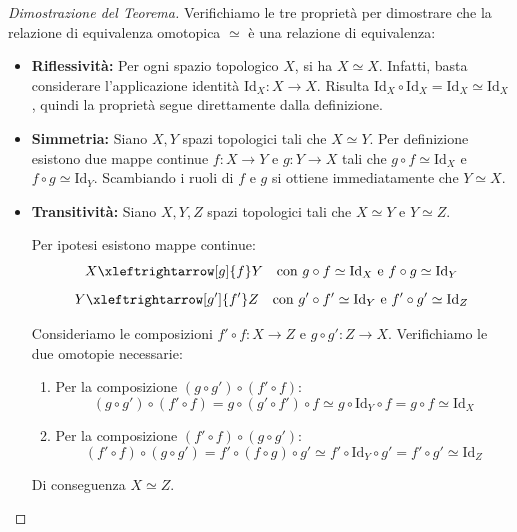 \begin{proof}[Dimostrazione del Teorema]
Verifichiamo le tre proprietà per dimostrare che la relazione di equivalenza omotopica $\simeq$ è una relazione di equivalenza:

\begin{itemize}
    \item \textbf{Riflessività:} Per ogni spazio topologico $X$, si ha $X \simeq X$.
    Infatti, basta considerare l'applicazione identità $\mathrm{Id}_X: X \to X$. Risulta $\mathrm{Id}_X \circ \mathrm{Id}_X = \mathrm{Id}_X \simeq \mathrm{Id}_X$, quindi la proprietà segue direttamente dalla definizione.

    \item \textbf{Simmetria:} Siano $X, Y$ spazi topologici tali che $X \simeq Y$.
    Per definizione esistono due mappe continue $f: X \to Y$ e $g: Y \to X$ tali che $g \circ f \simeq \mathrm{Id}_X$ e $f \circ g \simeq \mathrm{Id}_Y$. Scambiando i ruoli di $f$ e $g$ si ottiene immediatamente che $Y \simeq X$.

    \item \textbf{Transitività:} Siano $X, Y, Z$ spazi topologici tali che $X \simeq Y$ e $Y \simeq Z$.
    
    Per ipotesi esistono mappe continue:
    \[
    X \xleftrightarrow[g]{f} Y \quad \text{con } g \circ f \simeq \mathrm{Id}_X \text{ e } f \circ g \simeq \mathrm{Id}_Y
    \]
    \[
    Y \xleftrightarrow[g']{f'} Z \quad \text{con } g' \circ f' \simeq \mathrm{Id}_Y \text{ e } f' \circ g' \simeq \mathrm{Id}_Z
    \]
    
    Consideriamo le composizioni $f' \circ f: X \to Z$ e $g \circ g': Z \to X$. Verifichiamo le due omotopie necessarie:
    
    \begin{enumerate}[label=\roman*)]
        \item Per la composizione $(g \circ g') \circ (f' \circ f)$:
        \[
        (g \circ g') \circ (f' \circ f) = g \circ (g' \circ f') \circ f \simeq g \circ \mathrm{Id}_Y \circ f = g \circ f \simeq \mathrm{Id}_X
        \]
        \item Per la composizione $(f' \circ f) \circ (g \circ g')$:
        \[
        (f' \circ f) \circ (g \circ g') = f' \circ (f \circ g) \circ g' \simeq f' \circ \mathrm{Id}_Y \circ g' = f' \circ g' \simeq \mathrm{Id}_Z
        \]
    \end{enumerate}
    Di conseguenza $X \simeq Z$.
\end{itemize}
\end{proof}

